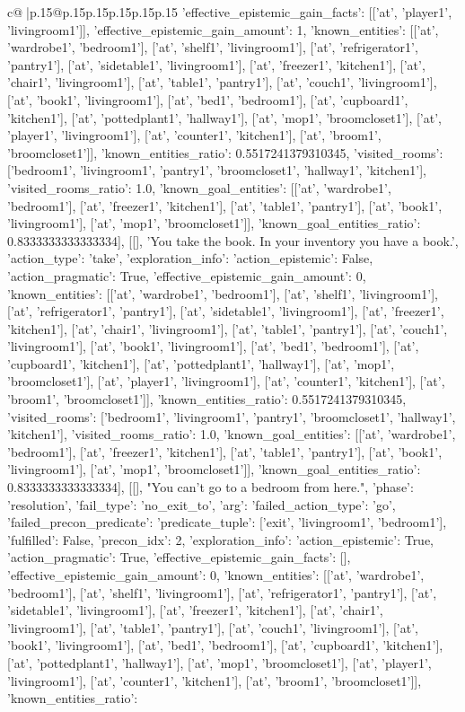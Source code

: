 \documentclass{article}
\begin{document}
{\begin{supertabular}{c@{$\;$}|p{.15\linewidth}@{}p{.15\linewidth}p{.15\linewidth}p{.15\linewidth}p{.15\linewidth}p{.15\linewidth}}
{{{'effective_epistemic_gain_facts': [['at', 'player1', 'livingroom1']], 'effective_epistemic_gain_amount': 1, 'known_entities': [['at', 'wardrobe1', 'bedroom1'], ['at', 'shelf1', 'livingroom1'], ['at', 'refrigerator1', 'pantry1'], ['at', 'sidetable1', 'livingroom1'], ['at', 'freezer1', 'kitchen1'], ['at', 'chair1', 'livingroom1'], ['at', 'table1', 'pantry1'], ['at', 'couch1', 'livingroom1'], ['at', 'book1', 'livingroom1'], ['at', 'bed1', 'bedroom1'], ['at', 'cupboard1', 'kitchen1'], ['at', 'pottedplant1', 'hallway1'], ['at', 'mop1', 'broomcloset1'], ['at', 'player1', 'livingroom1'], ['at', 'counter1', 'kitchen1'], ['at', 'broom1', 'broomcloset1']], 'known_entities_ratio': 0.5517241379310345, 'visited_rooms': ['bedroom1', 'livingroom1', 'pantry1', 'broomcloset1', 'hallway1', 'kitchen1'], 'visited_rooms_ratio': 1.0, 'known_goal_entities': [['at', 'wardrobe1', 'bedroom1'], ['at', 'freezer1', 'kitchen1'], ['at', 'table1', 'pantry1'], ['at', 'book1', 'livingroom1'], ['at', 'mop1', 'broomcloset1']], 'known_goal_entities_ratio': 0.8333333333333334}}], [[], 'You take the book. In your inventory you have a book.', {'action_type': 'take', 'exploration_info': {'action_epistemic': False, 'action_pragmatic': True, 'effective_epistemic_gain_amount': 0, 'known_entities': [['at', 'wardrobe1', 'bedroom1'], ['at', 'shelf1', 'livingroom1'], ['at', 'refrigerator1', 'pantry1'], ['at', 'sidetable1', 'livingroom1'], ['at', 'freezer1', 'kitchen1'], ['at', 'chair1', 'livingroom1'], ['at', 'table1', 'pantry1'], ['at', 'couch1', 'livingroom1'], ['at', 'book1', 'livingroom1'], ['at', 'bed1', 'bedroom1'], ['at', 'cupboard1', 'kitchen1'], ['at', 'pottedplant1', 'hallway1'], ['at', 'mop1', 'broomcloset1'], ['at', 'player1', 'livingroom1'], ['at', 'counter1', 'kitchen1'], ['at', 'broom1', 'broomcloset1']], 'known_entities_ratio': 0.5517241379310345, 'visited_rooms': ['bedroom1', 'livingroom1', 'pantry1', 'broomcloset1', 'hallway1', 'kitchen1'], 'visited_rooms_ratio': 1.0, 'known_goal_entities': [['at', 'wardrobe1', 'bedroom1'], ['at', 'freezer1', 'kitchen1'], ['at', 'table1', 'pantry1'], ['at', 'book1', 'livingroom1'], ['at', 'mop1', 'broomcloset1']], 'known_goal_entities_ratio': 0.8333333333333334}}], [[], "You can't go to a bedroom from here.", {'phase': 'resolution', 'fail_type': 'no_exit_to', 'arg': {'failed_action_type': 'go', 'failed_precon_predicate': {'predicate_tuple': ['exit', 'livingroom1', 'bedroom1'], 'fulfilled': False, 'precon_idx': 2}}, 'exploration_info': {'action_epistemic': True, 'action_pragmatic': True, 'effective_epistemic_gain_facts': [], 'effective_epistemic_gain_amount': 0, 'known_entities': [['at', 'wardrobe1', 'bedroom1'], ['at', 'shelf1', 'livingroom1'], ['at', 'refrigerator1', 'pantry1'], ['at', 'sidetable1', 'livingroom1'], ['at', 'freezer1', 'kitchen1'], ['at', 'chair1', 'livingroom1'], ['at', 'table1', 'pantry1'], ['at', 'couch1', 'livingroom1'], ['at', 'book1', 'livingroom1'], ['at', 'bed1', 'bedroom1'], ['at', 'cupboard1', 'kitchen1'], ['at', 'pottedplant1', 'hallway1'], ['at', 'mop1', 'broomcloset1'], ['at', 'player1', 'livingroom1'], ['at', 'counter1', 'kitchen1'], ['at', 'broom1', 'broomcloset1']], 'known_entities_ratio': }}}
\end{supertabular}}
\end{document}
